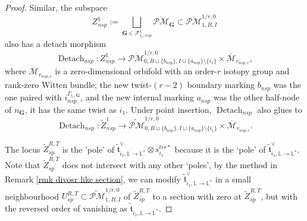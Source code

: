 \documentclass[11pt]{amsart}
\theoremstyle{definition}
\theoremstyle{remark}
\newcommand{\oPMb}{{\overline{\mathcal{PM}}}}
\newcommand{\nontilde}{}
\newcommand{\<}{\left<}
\renewcommand{\>}{\right>}
\numberwithin{equation}{section}
\def\Mbar{{\overline{\mathcal M}}}
\begin{document}
\begin{proof}
         Similar, the subspace 
         $$
         Z_{nsp}^{1}:=\bigsqcup_{\bm{G}\in \mathcal F^{1}_{i_1,nsp}}\oPMb_{\bm{G}}\subset \oPMb_{1,B,I}^{1/r,0}
         $$
         also has a detach morphism
         \begin{equation}\label{eq detach nsp}
         \operatorname{Detach}_{nsp}\colon  Z_{nsp}^{1} \to \oPMb^{1/r,0}_{0,B\sqcup\{b_{nsp}\}, I\sqcup \{a_{nsp}\}\setminus\{i_1\}}\times \Mbar_{v_{nsp,c}},
         \end{equation}
         where $\Mbar_{v_{nsp,c}}$ is a zero-dimensional orbifold with an order-$r$ isotopy group and rank-zero Witten bundle;  the new twist-$(r-2)$ boundary marking $b_{nsp}$ was the one paired with $i_{nsp}^{\Gamma_{i_1,\bm{G}}}$, and the new internal marking $a_{nsp}$ was the other half-node of $n_{\bm{G}}$, it has the same twist as $i_1$. Under point insertion, $\operatorname{Detach}_{nsp}$ also glues to 
         \begin{equation*}
         \operatorname{Detach}_{nsp}\colon \widetilde{Z}^1_{nsp}\to  \widetilde{\mathcal{PM}}^{1/r,0}_{0,B\sqcup\{b_{nsp}\}, I\sqcup \{a_{nsp}\}\setminus\{i_1\}}\times \Mbar_{v_{nsp,c}}.
         \end{equation*}
        

      
         
         The locus $\widetilde{Z}^{R,T}_{sp}$ is the 'pole' of $\tilde{\mathfrak{t}}^{\vee}_{i_1,\mathbb L \to \mathbb L^*}\otimes \nontilde{s}^{trr*}_{i_1}$ because it is the `pole' of $\tilde{\mathfrak{t}}^{\vee}_{i_1,\mathbb L \to \mathbb L^*}$. Note that $\widetilde{Z}^{R,T}_{sp}$ does not intersect with any other `poles', by the method in Remark \ref{rmk divosr like section}, we can modify $\tilde{\mathfrak{t}}^{\vee}_{i_1,\mathbb L \to \mathbb L^*}$ in a small neighbourhood $U^{R,T}_{sp}\subset \widetilde{\mathcal{PM}}^{1/r,0}_{1,B,I}$ of $\widetilde{Z}^{R,T}_{sp}$ to a section with zero at $\widetilde{Z}^{R,T}_{sp}$, but with the reversed order of vanishing as $\tilde{\mathfrak{t}}_{i_1,\mathbb L \to \mathbb L^*}$.


\end{proof}
\end{document}
